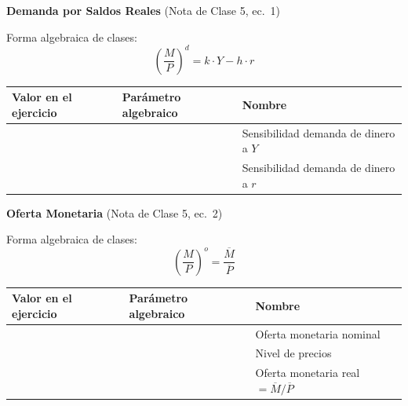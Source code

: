 \documentclass[11pt,a4paper]{article}
\newcommand{\barvar}[1]{\overline{#1}}
\begin{document}
\vspace{0.5cm}

\noindent\textbf{Demanda por Saldos Reales} \hfill \textcolor{grismedio}{\small (Nota de Clase 5, ec.\ 1)}

\vspace{0.1cm}
\noindent Forma algebraica de clases:
\[
    \left(\frac{M}{P}\right)^d = k \cdot Y - h \cdot r
\]

\begin{center}
\renewcommand{\arraystretch}{1.6}
\begin{tabular}{|>{\centering\arraybackslash}m{3cm}|>{\centering\arraybackslash}m{3.5cm}|>{\centering\arraybackslash}m{5cm}|}
    \hline
    \rowcolor{grisclaro}
    \textbf{Valor en el ejercicio} & \textbf{Par\'{a}metro algebraico} & \textbf{Nombre} \\
    \hline
    & & Sensibilidad demanda de dinero a $Y$ \\
    \hline
    & & Sensibilidad demanda de dinero a $r$ \\
    \hline
\end{tabular}
\end{center}

\vspace{0.5cm}

\noindent\textbf{Oferta Monetaria} \hfill \textcolor{grismedio}{\small (Nota de Clase 5, ec.\ 2)}

\vspace{0.1cm}
\noindent Forma algebraica de clases:
\[
    \left(\frac{M}{P}\right)^o = \frac{\barvar{M}}{\barvar{P}}
\]

\begin{center}
\renewcommand{\arraystretch}{1.6}
\begin{tabular}{|>{\centering\arraybackslash}m{3cm}|>{\centering\arraybackslash}m{3.5cm}|>{\centering\arraybackslash}m{5cm}|}
    \hline
    \rowcolor{grisclaro}
    \textbf{Valor en el ejercicio} & \textbf{Par\'{a}metro algebraico} & \textbf{Nombre} \\
    \hline
    & & Oferta monetaria nominal \\
    \hline
    & & Nivel de precios \\
    \hline
    & & Oferta monetaria real $= \barvar{M}/\barvar{P}$ \\
    \hline
\end{tabular}
\end{center}

\vspace{0.5cm}
\end{document}
